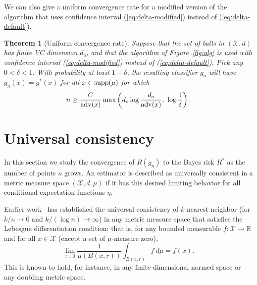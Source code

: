 \documentclass{article}
\def\R{{\mathbb{R}}}
\def\X{{\mathcal X}}
\def\supp{{\rm supp}}
\def\adv{{\rm adv}}
\newtheorem{theorem}{Theorem}
\begin{document}
We can also give a uniform convergence rate for a modified version of the algorithm that uses confidence interval (\ref{eq:delta-modified}) instead of (\ref{eq:delta-default}).

\begin{theorem} [Uniform convergence rate]
Suppose that the set of balls in $(\X,d)$ has finite VC dimension $d_o$, and that the algorithm of Figure~\ref{fig:alg} is used with confidence interval (\ref{eq:delta-modified}) instead of (\ref{eq:delta-default}). Pick any $0 < \delta < 1$. With probability at least $1-\delta$, the resulting classifier $g_n$ will have $g_n(x) = g^*(x)$ for all $x \in \supp(\mu)$ for which 
$$ n \geq \frac{C}{\adv(x)} \max \left( d_o \log \frac{d_o}{\adv(x)}, \ \log \frac{1}{\delta} \right).$$
\label{thm:uniform-rate}
\end{theorem}


\section{Universal consistency}
\label{sec:universal-consistency}

In this section we study the convergence of $R(g_n)$ to the Bayes risk $R^*$ as the number of points $n$ grows. An estimator is described as universally consistent in a metric measure space $(\X, d, \mu)$ if it has this desired limiting behavior for all conditional expectation functions $\eta$.

Earlier work~\cite{ChaudhuriDasgupta2014} has established the universal consistency of $k$-nearest neighbor (for $k/n \rightarrow 0$ and $k/(\log n) \rightarrow \infty$) in any metric measure space that satisfies the Lebesgue differentiation condition: that is, for any bounded measurable $f: \X \rightarrow \R$ and for all $x \in \X$ (except a set of $\mu$-measure zero),
\begin{equation}
\lim_{r \downarrow 0} \frac{1}{\mu(B(x,r))} \int_{B(x,r)} f \ d\mu = f(x) .
\label{eq:lebesgue-condition}
\end{equation}
This is known to hold, for instance, in any finite-dimensional normed space or any doubling metric space.
\end{document}
